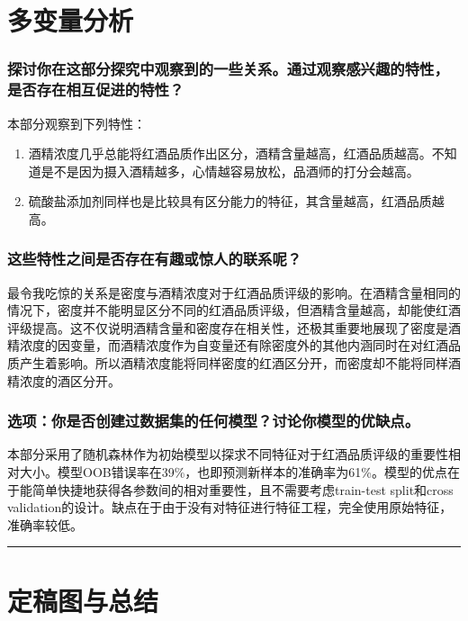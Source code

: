 \documentclass[]{article}
\providecommand{\tightlist}{%
  \setlength{\itemsep}{0pt}\setlength{\parskip}{0pt}}
\begin{document}
\section{多变量分析}

\subsubsection{探讨你在这部分探究中观察到的一些关系。通过观察感兴趣的特性，是否存在相互促进的特性？}

本部分观察到下列特性：

\begin{enumerate}
\def\labelenumi{\arabic{enumi}.}
\tightlist
\item
  酒精浓度几乎总能将红酒品质作出区分，酒精含量越高，红酒品质越高。不知道是不是因为摄入酒精越多，心情越容易放松，品酒师的打分会越高。
\item
  硫酸盐添加剂同样也是比较具有区分能力的特征，其含量越高，红酒品质越高。
\end{enumerate}

\subsubsection{这些特性之间是否存在有趣或惊人的联系呢？}

最令我吃惊的关系是密度与酒精浓度对于红酒品质评级的影响。在酒精含量相同的情况下，密度并不能明显区分不同的红酒品质评级，但酒精含量越高，却能使红酒评级提高。这不仅说明酒精含量和密度存在相关性，还极其重要地展现了密度是酒精浓度的因变量，而酒精浓度作为自变量还有除密度外的其他内涵同时在对红酒品质产生着影响。所以酒精浓度能将同样密度的红酒区分开，而密度却不能将同样酒精浓度的酒区分开。

\subsubsection{选项：你是否创建过数据集的任何模型？讨论你模型的优缺点。}

本部分采用了随机森林作为初始模型以探求不同特征对于红酒品质评级的重要性相对大小。模型OOB错误率在39\%，也即预测新样本的准确率为61\%。模型的优点在于能简单快捷地获得各参数间的相对重要性，且不需要考虑train-test
split和cross
validation的设计。缺点在于由于没有对特征进行特征工程，完全使用原始特征，准确率较低。

\begin{center}\rule{0.5\linewidth}{\linethickness}\end{center}

\section{定稿图与总结}
\end{document}
